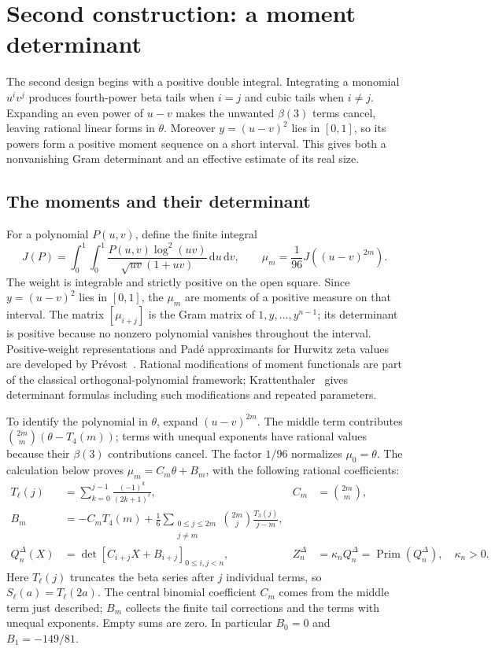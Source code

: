 \documentclass[11pt]{article}
\theoremstyle{definition}
\theoremstyle{remark}
\numberwithin{equation}{section}
\newcommand{\dd}{\,\mathrm d}
\newcommand{\PP}{\operatorname{Prim}}
\begin{document}
\section{Second construction: a moment determinant}\label{sec:gram}

The second design begins with a positive double integral. Integrating
a monomial $u^iv^j$ produces fourth-power beta tails when $i=j$ and
cubic tails when $i\ne j$. Expanding an even power of $u-v$ makes the
unwanted $\beta(3)$ terms cancel, leaving rational linear forms in
$\theta$. Moreover $y=(u-v)^2$ lies in $[0,1]$, so its powers form a
positive moment sequence on a short interval. This gives both a
nonvanishing Gram determinant and an effective estimate of its real size.

\subsection{The moments and their determinant}\label{sec:gram-construction}

For a polynomial $P(u,v)$, define the finite integral
\begin{equation}\label{eq:J}
 J(P)=\int_0^1\int_0^1
       \frac{P(u,v)\log^2(uv)}{\sqrt{uv}(1+uv)}\dd u\dd v,
 \qquad \mu_m=\frac1{96}J((u-v)^{2m}).
\end{equation}
The weight is integrable and strictly positive on the open square.
Since $y=(u-v)^2$ lies in $[0,1]$, the $\mu_m$ are moments of a
positive measure on that interval. The matrix $[\mu_{i+j}]$ is the
Gram matrix of $1,y,\ldots,y^{n-1}$; its determinant is positive
because no nonzero polynomial vanishes throughout the interval.
Positive-weight representations and Pad\'e approximants for Hurwitz zeta
values are developed by Pr\'evost~\cite{Prevost}. Rational modifications
of moment functionals are part of the classical orthogonal-polynomial
framework; Krattenthaler~\cite{Krattenthaler} gives determinant formulas
including such modifications and repeated parameters.

To identify the polynomial in $\theta$, expand $(u-v)^{2m}$.
The middle term contributes
$\binom{2m}{m}(\theta-T_4(m))$; terms with unequal exponents have
rational values because their $\beta(3)$ contributions cancel. The factor
$1/96$ normalizes $\mu_0=\theta$. The calculation below proves
$\mu_m=C_m\theta+B_m$, with the following rational coefficients:
\begin{align}
 T_\ell(j)&=\sum_{k=0}^{j-1}\frac{(-1)^k}{(2k+1)^\ell},
 &C_m&=\binom{2m}{m},\label{eq:T}\\
 B_m&=-C_mT_4(m)+\frac16
 \sum_{\substack{0\leq j\leq 2m\\j\ne m}}
       \binom{2m}{j}\frac{T_3(j)}{j-m},\label{eq:B}\\
 Q_n^{\Delta}(X)&=\det[C_{i+j}X+B_{i+j}]_{0\leq i,j<n},
 &Z_n^{\Delta}&=\kappa_n Q_n^{\Delta}=\PP(Q_n^{\Delta}),\quad \kappa_n>0.
 \label{eq:delta-Q}
\end{align}
Here $T_\ell(j)$ truncates the beta series after $j$ individual terms,
so $S_\ell(a)=T_\ell(2a)$. The central binomial coefficient $C_m$
comes from the middle term just described; $B_m$ collects the finite
tail corrections and the terms with unequal exponents. Empty sums are zero.
In particular $B_0=0$ and $B_1=-149/81$.
\end{document}
